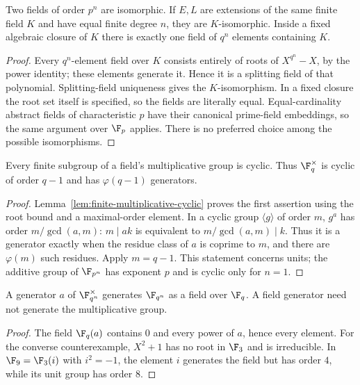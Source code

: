 \begin{theorem}
Two fields of order $p^n$ are isomorphic. If $E,L$ are extensions of the same finite field $K$ and have equal finite degree $n$, they are $K$-isomorphic. Inside a fixed algebraic closure of $K$ there is exactly one field of $q^n$ elements containing $K$.
\end{theorem}
\begin{proof}
Every $q^n$-element field over $K$ consists entirely of roots of $X^{q^n}-X$, by the power identity; these elements generate it. Hence it is a splitting field of that polynomial. Splitting-field uniqueness gives the $K$-isomorphism. In a fixed closure the root set itself is specified, so the fields are literally equal. Equal-cardinality abstract fields of characteristic $p$ have their canonical prime-field embeddings, so the same argument over $\F_p$ applies. There is no preferred choice among the possible isomorphisms.
\end{proof}

\begin{theorem}
Every finite subgroup of a field's multiplicative group is cyclic. Thus $\F_q^\times$ is cyclic of order $q-1$ and has $\varphi(q-1)$ generators.
\end{theorem}
\begin{proof}
Lemma~\ref{lem:finite-multiplicative-cyclic} proves the first assertion using the root bound and a maximal-order element. In a cyclic group $\langle g\rangle$ of order $m$, $g^a$ has order $m/\gcd(a,m)$: $m\mid ak$ is equivalent to $m/\gcd(a,m)\mid k$. Thus it is a generator exactly when the residue class of $a$ is coprime to $m$, and there are $\varphi(m)$ such residues. Apply $m=q-1$. This statement concerns units; the additive group of $\F_{p^n}$ has exponent $p$ and is cyclic only for $n=1$.
\end{proof}

\begin{proposition}
A generator $a$ of $\F_{q^n}^\times$ generates $\F_{q^n}$ as a field over $\F_q$. A field generator need not generate the multiplicative group.
\end{proposition}
\begin{proof}
The field $\F_q(a)$ contains $0$ and every power of $a$, hence every element. For the converse counterexample, $X^2+1$ has no root in $\F_3$ and is irreducible. In $\F_9=\F_3(i)$ with $i^2=-1$, the element $i$ generates the field but has order $4$, while its unit group has order $8$.
\end{proof}

